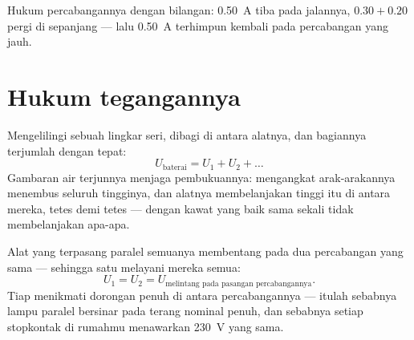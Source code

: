 \begin{omfigure}

{\small Hukum percabangannya dengan bilangan: \qty{0.50}{A} tiba pada
 jalannya, $0.30 + 0.20$ pergi di sepanjang  --- lalu
\qty{0.50}{A} terhimpun kembali pada percabangan yang jauh.}
\end{omfigure}

\section{Hukum tegangannya}

\begin{proposition}\label{prop:g8:circuit-laws:seriesU}
Mengelilingi sebuah lingkar seri,   dibagi di antara
alatnya, dan bagiannya terjumlah dengan tepat:
\[
U_{\text{baterai}} = U_1 + U_2 + \dots
\]
Gambaran air terjunnya menjaga pembukuannya:  mengangkat
arak-arakannya menembus seluruh tingginya, dan alatnya membelanjakan
tinggi itu di antara mereka, tetes demi tetes --- dengan kawat yang
baik sama sekali tidak membelanjakan apa-apa.
\end{proposition}

\begin{proposition}\label{prop:g8:circuit-laws:parallelU}
Alat yang terpasang paralel semuanya membentang pada dua percabangan
yang sama --- sehingga satu  melayani mereka semua:
\[
U_1 = U_2 = U_{\text{melintang pada pasangan percabangannya}} .
\]
Tiap  menikmati dorongan penuh di antara percabangannya ---
itulah sebabnya lampu paralel bersinar pada terang nominal penuh, dan
sebabnya setiap stopkontak di rumahmu menawarkan \qty{230}{V} yang
sama.
\end{proposition}

